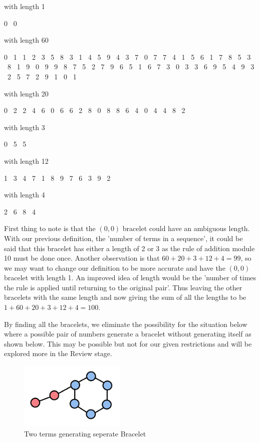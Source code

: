 \documentclass[11pt]{article}
\newcommand{\keywordfont}{\textsc}
\newcommand{\keyword}[1]{%
  \marginpar{\raggedright\small\keywordfont{#1}}}
\begin{document}
\begin{description}
    \item[Bracelet (0, 0)] with length 1
    \item 0 \ 0
    \item[Bracelet (0, 1)] with length 60
    \item 0 \ 1 \ 1 \ 2 \ 3 \ 5 \ 8 \ 3 \ 1 \ 4 \ 5 \ 9 \ 4 \ 3 \ 7 \ 0 \ 7 \ 7 \ 4 \ 1 \ 5 \ 6 \ 1 \ 7 \ 8 \ 5 \ 3 \ 8 \ 1 \ 9 \ 0 \ 9 \ 9 \ 8 \ 7 \ 5 \ 2 \ 7 \ 9 \ 6 \ 5 \ 1 \ 6 \ 7 \ 3 \ 0 \ 3 \ 3 \ 6 \ 9 \ 5 \ 4 \ 9 \ 3 \ 2 \ 5 \ 7 \ 2 \ 9 \ 1 \ 0 \ 1 \ 
    \item[Bracelet (0, 2)] with length 20
    \item 0 \ 2 \ 2 \ 4 \ 6 \ 0 \ 6 \ 6 \ 2 \ 8 \ 0 \ 8 \ 8 \ 6 \ 4 \ 0 \ 4 \ 4 \ 8 \ 2
    \item[Bracelet (0, 5)] with length 3
    \item 0 \ 5 \ 5 
    \item[Bracelet (1, 3)] with length 12
    \item 1 \ 3 \ 4 \ 7 \ 1 \ 8 \ 9 \ 7 \ 6 \ 3 \ 9 \ 2
    \item[Bracelet (2, 6)] with length 4
    \item 2 \ 6 \ 8 \ 4 
\end{description}

First thing to note is that the $(0, 0)$ bracelet could have an ambiguous length. With our previous definition, the 'number of terms in a sequence', it could be said that this bracelet has either a length of 2 or 3 as the rule of addition module 10 must be done once. Another observation is that $60 + 20+ 3 + 12 + 4 = 99$, so we may want to change our definition to be more accurate and have the $(0, 0)$ bracelet with length 1. An improved idea of \keyword{Introduce} length would be the 'number of times the rule is applied until returning to the original pair'. Thus leaving the other bracelets with the same length and now giving the sum of all the lengths to be $1 + 60 + 20+ 3 + 12 + 4 = 100$.
    

By finding all the bracelets, we eliminate the possibility for the situation below where a possible pair of numbers generate a bracelet without generating itself as shown below. This may be possible but not for our given restrictions and will be explored more in the Review stage.

\begin{figure}[h] %
   \centering
   \includegraphics[width=2in]{samplefig2.png} 
   \caption{Two terms generating seperate Bracelet}
   \label{myfig}
\end{figure}
\end{document}
